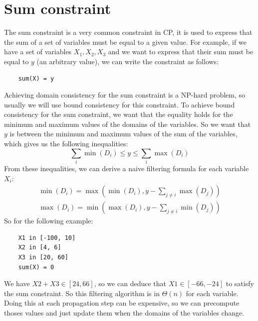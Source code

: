 \documentclass[12pt, openany]{report}
\theoremstyle{definition}
\begin{document}
\section{Sum constraint}
The sum constraint is a very common constraint in CP, it is used to express that the sum of a set of variables must be equal to a given value. For example, if we have a set of variables $X_1, X_2, X_3$ and we want to express that their sum must be equal to $y$ (an arbitrary value), we can write the constraint as follows:
\begin{lstlisting}    
    sum(X) = y
\end{lstlisting}
Achieving domain consistency for the sum constraint is a NP-hard problem, so usually we will use bound consistency for this constraint. To achieve bound consistency for the sum constraint, we want that the equality holds for the minimum and maximum values of the domains of the variables. So we want that $y$ is between the minimum and maximum values of the sum of the variables, which gives us the following inequalities:
\begin{equation}
    \sum_{i} \min(D_i) \leq y \leq \sum_{i} \max(D_i)
\end{equation}
From these inequalities, we can derive a naive filtering formula for each variable $X_i$:
\begin{equation}
    \begin{aligned}
        \min(D_i) = \max(\min(D_i), y - \sum_{j \neq i} \max(D_j))\\
        \max(D_i) = \min(\max(D_i), y - \sum_{j \neq i} \min(D_j))
    \end{aligned}
\end{equation}
So for the following example:
\begin{lstlisting}
    X1 in [-100, 10]
    X2 in [4, 6]
    X3 in [20, 60]
    sum(X) = 0
\end{lstlisting}
We have $X2 + X3 \in [24, 66]$, so we can deduce that $X1 \in [-66, -24]$ to satisfy the sum constraint. So this filtering algorithm is in $\Theta(n)$ for each variable. Doing this at each propagation step can be expensive, so we can precompute thoses values and just update them when the domains of the variables change.
\end{document}
